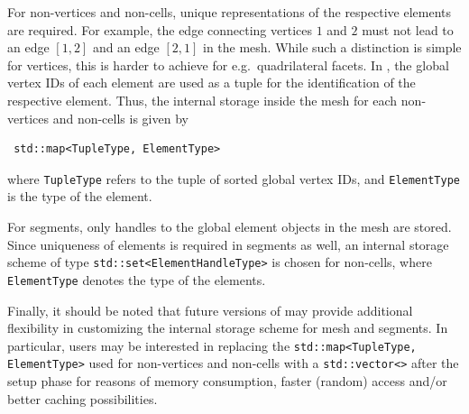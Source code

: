 For non-vertices and non-cells, unique representations of the respective elements are required. For example, the edge connecting vertices $1$ and $2$ must not lead to an edge $[1,2]$ and an edge $[2,1]$ in the mesh.
While such a distinction is simple for vertices, this is harder to achieve for e.g.~quadrilateral facets.
In {\ViennaGrid}, the global vertex IDs of each element are used as a tuple for the identification of the respective element.
Thus, the internal storage inside the mesh for each non-vertices and non-cells is given by
\begin{lstlisting}
 std::map<TupleType, ElementType>
\end{lstlisting}
where \lstinline|TupleType| refers to the tuple of sorted global vertex IDs, and \lstinline|ElementType| is the type of the element.

For segments, only handles to the global element objects in the mesh are stored.
Since uniqueness of elements is required in segments as well, an internal storage scheme of type \lstinline|std::set<ElementHandleType>| is chosen
for non-cells, where \lstinline|ElementType| denotes the type of the elements.

Finally, it should be noted that future versions of {\ViennaGrid} may provide additional flexibility in customizing the internal storage scheme for mesh and segments.
In particular, users may be interested in replacing the \lstinline|std::map<TupleType, ElementType>| used for non-vertices and non-cells with a \lstinline|std::vector<>| after the setup phase for reasons of memory consumption, faster (random) access and/or better caching possibilities.



